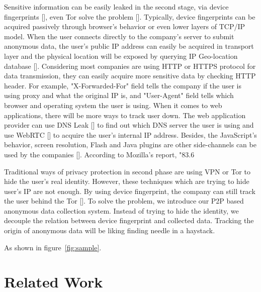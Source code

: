 \documentclass[twocolumn]{article}
\begin{document}
Sensitive information can be easily leaked in the second stage, via device fingerprints [], even Tor solve the problem []. Typically, device fingerprints can be acquired passively through browser's behavior or even lower layers of TCP/IP model. When the user connects directly to the company's server to submit anonymous data, the user's public IP address can easily be acquired in transport layer and the physical location will be exposed by querying IP Geo-location database []. Considering most companies are using HTTP or HTTPS protocol for data transmission, they can easily acquire more sensitive data by checking HTTP header. For example, "X-Forwarded-For" field tells the company if the user is using proxy and what the original IP is, and "User-Agent" field tells which browser and operating system the user is using. When it comes to web applications, there will be more ways to track user down. The web application provider can use DNS Leak [] to find out which DNS server the user is using and use WebRTC [] to acquire the user's internal IP address. Besides, the JavaScript's behavior, screen resolution, Flash and Java plugins are other side-channels can be used by the companies []. According to Mozilla's report, "83.6%

Traditional ways of privacy protection in second phase are using VPN or Tor to hide the user's real identity. However, these techniques which are trying to hide user's IP are not enough. By using device fingerprint, the company can still track the user behind the Tor []. To solve the problem, we introduce our P2P based anonymous data collection system. Instead of trying to hide the identity, we decouple the relation between device fingerprint and collected data. Tracking the origin of anonymous data will be liking finding needle in a haystack.

  As shown in figure~\ref{fig:sample}.

  



\section{Related Work}


{\footnotesize 

}
\end{document}
